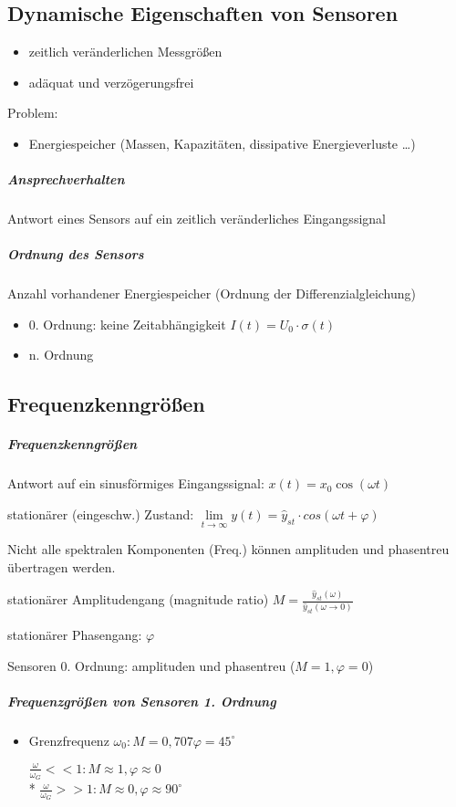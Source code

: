 \documentclass[a4paper]{scrartcl}
\begin{document}
\subsection{Dynamische Eigenschaften von Sensoren}
\begin{itemize}
\item zeitlich veränderlichen Messgrößen
\item adäquat und verzögerungsfrei
\end{itemize}


Problem:
\begin{itemize}
\item Energiespeicher (Massen, Kapazitäten, dissipative Energieverluste \dots)
\end{itemize}

\subparagraph{Ansprechverhalten} Antwort eines Sensors auf ein zeitlich veränderliches Eingangssignal

\subparagraph{Ordnung des Sensors} Anzahl vorhandener Energiespeicher (Ordnung der Differenzialgleichung)
\begin{itemize}
\item 0. Ordnung: keine Zeitabhängigkeit $I(t) = U_0 \cdot \sigma (t)$
\item n. Ordnung
\end{itemize}


\subsection{Frequenzkenngrößen}
\subparagraph{Frequenzkenngrößen} Antwort auf ein sinusförmiges Eingangssignal: $x(t) = x_0 \cos{(\omega t)}$

stationärer (eingeschw.) Zustand: $\lim\limits_{t \to \infty} y (t) = \hat{y}_{st} \cdot cos{(\omega t + \varphi)}$

Nicht alle spektralen Komponenten (Freq.) können amplituden und phasentreu übertragen werden.

stationärer Amplitudengang (magnitude ratio) $ M = \frac{\hat{y}_{st} (\omega)}{\hat{y}_{st} (\omega \to 0 )}$

stationärer Phasengang: $\varphi$

Sensoren 0. Ordnung: amplituden und phasentreu ($M=1 , \varphi = 0$)

\subparagraph{Frequenzgrößen von Sensoren 1. Ordnung} 
\begin{itemize}
\item Grenzfrequenz $\omega_0 : M = 0,707 \varphi = 45^\circ$

$\frac{\omega}{\omega_G} << 1: M \approx 1, \varphi \approx 0$\\*
$\frac{\omega}{\omega_G} >> 1: M \approx 0, \varphi \approx 90^\circ$


\end{itemize}
\end{document}

